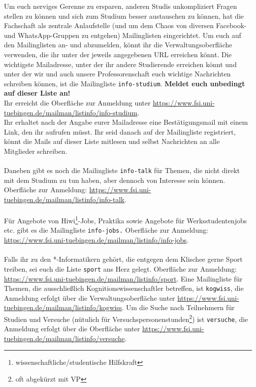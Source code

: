 Um euch nerviges Gerenne zu ersparen, anderen Studis unkompliziert Fragen stellen zu können und
sich zum Studium besser austauschen zu können, hat die Fachschaft als zentrale Anlaufstelle (und um dem Chaos von diversen Facebook- und WhatsApp-Gruppen zu entgehen) Mailinglisten eingerichtet. 
Um euch auf den Mailinglisten an- und abzumelden, könnt ihr die Verwaltungsoberfläche verwenden, die ihr unter der jeweils angegebenen URL erreichen könnt.
Die wichtigste Mailadresse, unter der ihr andere Studierende erreichen könnt und unter der wir und auch unsere Professorenschaft euch wichtige Nachrichten schreiben können, ist die Mailingliste \texttt{info-studium}. \textbf{Meldet euch unbedingt auf dieser Liste an!}\\
Ihr erreicht die Oberfläche zur Anmeldung unter \url{https://www.fsi.uni-tuebingen.de/mailman/listinfo/info-studium}. \\
Ihr erhaltet nach der Angabe eurer Mailadresse eine Bestätigungsmail mit einem Link, den ihr aufrufen müsst. Ihr seid danach auf der Mailingliste registriert, könnt die Mails auf dieser Liste mitlesen und selbst Nachrichten an alle Mitglieder schreiben. \\\\
Daneben gibt es noch die Mailingliste \texttt{info-talk} für Themen, die nicht direkt mit dem Studium
zu tun haben, aber dennoch von Interesse sein können. Oberfläche zur Anmeldung: \url{https://www.fsi.uni-tuebingen.de/mailman/listinfo/info-talk}. \\\\
Für Angebote von Hiwi\footnote{wissenschaftliche/studentische Hilfskraft}-Jobs, Praktika sowie Angebote für Werksstudentenjobs etc. gibt es die Mailingliste \texttt{info-jobs.} Oberfläche zur Anmeldung: \url{https://www.fsi.uni-tuebingen.de/mailman/listinfo/info-jobs}.\\\\
Falls ihr zu den *-Informatikern gehört, die entgegen dem Klischee gerne Sport treiben, sei euch die Liste \texttt{sport} ans Herz gelegt. Oberfläche zur Anmeldung: \url{https://www.fsi.uni-tuebingen.de/mailman/listinfo/sport}.
\ifkogwiss 
Eine Mailingliste für Themen, die ausschließlich Kognitionswissenschaftler betreffen, ist
\texttt{kogwiss}, die Anmeldung erfolgt über die Verwaltungsoberfläche unter \url{https://www.fsi.uni-tuebingen.de/mailman/listinfo/kogwiss}.
Um die Suche nach Teilnehmern für Studien und Versuche (nütulich für Versuchspersonenstunden\footnote{oft abgekürzt mit VP}) ist \texttt{versuche}, 
die Anmeldung erfolgt über die Oberfläche unter \url{https://www.fsi.uni-tuebingen.de/mailman/listinfo/versuche}.

